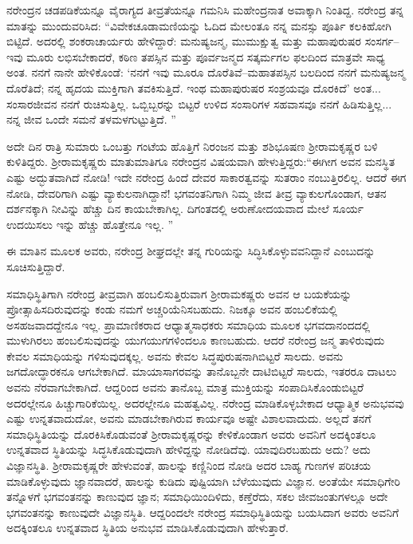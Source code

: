 ನರೇಂದ್ರನ ಚಡಪಡಿಕೆಯನ್ನೂ ವೈರಾಗ್ಯದ ತೀವ್ರತೆಯನ್ನೂ ಗಮನಿಸಿ ಮಹೇಂದ್ರನಾತ ಅವಾಕ್ಕಾಗಿ ನಿಂತಿದ್ದ. ನರೇಂದ್ರ ತನ್ನ ಮಾತನ್ನು ಮುಂದುವರಿಸಿದ: “ವಿವೇಕಚೂಡಾಮಣಿಯನ್ನು ಓದಿದ ಮೇಲಂತೂ ನನ್ನ ಮನಸ್ಸು ಪೂರ್ತಿ ಕಲಕಿಹೋಗಿ ಬಿಟ್ಟಿದೆ. ಅದರಲ್ಲಿ ಶಂಕರಾಚಾರ್ಯರು ಹೇಳಿದ್ದಾರೆ: ಮನುಷ್ಯಜನ್ಮ, ಮುಮುಕ್ಷುತ್ವ ಮತ್ತು ಮಹಾಪುರುಷರ ಸಂಸರ್ಗ–ಇವು ಮೂರು ಲಭಿಸಬೇಕಾದರೆ, ಕಠಿಣ ತಪಸ್ಸಿನ ಮತ್ತು ಪೂರ್ವಜನ್ಮದ ಸತ್ಕರ್ಮಗಲ ಫಲದಿಂದ ಮಾತ್ರವೇ ಸಾಧ್ಯ ಅಂತ. ನನಗೆ ನಾನೇ ಹೇಳಿಕೊಂಡೆ: ‘ನನಗೆ ಇವು ಮೂರೂ ದೊರೆತಿವೆ–ಮಹಾತಪಸ್ಸಿನ ಬಲದಿಂದ ನನಗೆ ಮನುಷ್ಯಜನ್ಮ ದೊರೆತಿದೆ; ನನ್ನ ಹೃದಯ ಮುಕ್ತಿಗಾಗಿ ತವಕಿಸುತ್ತಿದೆ. ಇಂಥ ಮಹಾಪುರುಷರ ಸಂಶ್ರಯವೂ ದೊರಕಿದೆ’ ಅಂತ... ಸಂಸಾರಜೀವನ ನನಗೆ ರುಚಿಸುತ್ತಿಲ್ಲ. ಒಬ್ಬಿಬ್ಬರನ್ನು ಬಿಟ್ಟರೆ ಉಳಿದ ಸಂಸಾರಿಗಳ ಸಹವಾಸವೂ ನನಗೆ ಹಿಡಿಸುತ್ತಿಲ್ಲ... ನನ್ನ ಜೀವ ಒಂದೇ ಸಮನೆ ತಳಮಳಗುಟ್ಟುತ್ತಿದೆ. ”

ಅದೇ ದಿನ ರಾತ್ರಿ ಸುಮಾರು ಒಂಬತ್ತು ಗಂಟೆಯ ಹೊತ್ತಿಗೆ ನಿರಂಜನ ಮತ್ತು ಶಶಿಭೂಷಣ ಶ್ರೀರಾಮಕೃಷ್ಣರ ಬಳಿ ಕುಳಿತಿದ್ದರು. ಶ್ರೀರಾಮಕೃಷ್ಣರು ಮಾತುಮಾತಿಗೂ ನರೇಂದ್ರನ ವಿಷಯವಾಗಿ ಹೇಳುತ್ತಿದ್ದರು:“ಈಗೀಗ ಅವನ ಮನಸ್ಥಿತ ಎಷ್ಟು ಅದ್ಭುತವಾಗಿದೆ ನೋಡಿ! ಇದೇ ನರೇಂದ್ರ ಹಿಂದೆ ದೇವರ ಸಾಕಾರತ್ವವನ್ನು ಸುತರಾಂ ನಂಬುತ್ತಿರಲಿಲ್ಲ. ಆದರೆ ಈಗ ನೋಡಿ, ದೇವರಿಗಾಗಿ ಎಷ್ಟು ವ್ಯಾಕುಲನಾಗಿದ್ದಾನೆ! ಭಗವಂತನಿಗಾಗಿ ನಿಮ್ಮ ಜೀವ ತೀವ್ರ ವ್ಯಾಕುಲಗೊಂಡಾಗ, ಆತನ ದರ್ಶನಕ್ಕಾಗಿ ನೀವಿನ್ನು ಹೆಚ್ಚು ದಿನ ಕಾಯಬೇಕಾಗಿಲ್ಲ. ದಿಗಂತದಲ್ಲಿ ಅರುಣೋದಯವಾದ ಮೇಲೆ ಸೂರ್ಯ ಉದಯಿಸಲು ಇನ್ನು ಹೆಚ್ಚು ಹೊತ್ತೇನೂ ಇಲ್ಲ. ”

ಈ ಮಾತಿನ ಮೂಲಕ ಅವರು, ನರೇಂದ್ರ ಶೀಘ್ರದಲ್ಲೇ ತನ್ನ ಗುರಿಯನ್ನು ಸಿದ್ಧಿಸಿಕೊಳ್ಳುವವನಿದ್ದಾನೆ ಎಂಬುದನ್ನು ಸೂಚಿಸುತ್ತಿದ್ದಾರೆ. 

ಸಮಾಧಿಸ್ಥಿತಿಗಾಗಿ ನರೇಂದ್ರ ತೀವ್ರವಾಗಿ ಹಂಬಲಿಸುತ್ತಿರುವಾಗ ಶ್ರೀರಾಮಕಷ್ಣರು ಅವನ ಆ ಬಯಕೆಯನ್ನು ಪ್ರೋತ್ಸಾಹಿಸದಿರುವುದನ್ನು ಕಂಡು ನಮಗೆ ಅಚ್ಚರಿಯೆನಿಸಬಹುದು. ನಿಜಕ್ಕೂ ಅವನ ಹಂಬಲಿಕೆಯಲ್ಲಿ ಅಸಹಜವಾದದ್ದೇನೂ ಇಲ್ಲ. ಪ್ರಾಮಾಣಿಕರಾದ ಆಧ್ಯಾತ್ಮಸಾಧಕರು ಸಮಾಧಿಯ ಮೂಲಕ ಭಗವದಾನಂದದಲ್ಲಿ ಮುಳುಗಿರಲು ಹಂಬಲಿಸುವುದನ್ನು ಯುಗಯುಗಗಳಿಂದಲೂ ಕಾಣಬಹುದು. ಆದರೆ ನರೇಂದ್ರ ಜನ್ಮ ತಾಳಿರುವುದು ಕೇವಲ ಸಮಾಧಿಯನ್ನು ಗಳಿಸುವುದಕ್ಕಲ್ಲ. ಅವನು ಕೇವಲ ಸಿದ್ಧಪುರುಷನಾಗಿಬಿಟ್ಟರೆ ಸಾಲದು. ಅವನು ಜಗದೋದ್ಧಾರಕನೂ ಆಗಬೇಕಾಗಿದೆ. ಮಾಯಾಸಾಗರವನ್ನು ತಾನೊಬ್ಬನೇ ದಾಟಿಬಿಟ್ಟರೆ ಸಾಲದು, ಇತರರೂ ದಾಟಲು ಅವನು ನೆರವಾಗಬೇಕಾಗಿದೆ. ಆದ್ದರಿಂದ ಅವನು ತಾನೊಬ್ಬ ಮಾತ್ರ ಮುಕ್ತಿಯನ್ನು ಸಂಪಾದಿಸಿಕೊಂಡುಬಿಟ್ಟರೆ ಅದರಲ್ಲೇನೂ ಹಿಚ್ಚುಗಾರಿಕೆಯಿಲ್ಲ. ಅದರಲ್ಲೇನೂ ಮಹತ್ವವಿಲ್ಲ. ನರೇಂದ್ರ ಮಾಡಿಕೊಳ್ಳಬೇಕಾದ ಆಧ್ಯಾತ್ಮಿಕ ಅನುಭವವು ಎಷ್ಟು ಉನ್ನತವಾದುದೋ, ಅವನು ಮಾಡಬೇಕಾಗಿರುವ ಕಾರ್ಯವೂ ಅಷ್ಟೇ ವಿಶಾಲವಾದುದು. ಅಲ್ಲದೆ ತನಗೆ ಸಮಾಧಿಸ್ಥಿತಿಯನ್ನು ದೊರಕಿಸಿಕೊಡುವಂತೆ ಶ್ರೀರಾಮಕೃಷ್ಣರನ್ನು ಕೇಳಿಕೊಂಡಾಗ ಅವರು ಅವನಿಗೆ ಅದಕ್ಕಿಂತಲೂ ಉನ್ನತವಾದ ಸ್ಥಿತಿಯನ್ನು ಸಿದ್ಧಸಿಕೊಡುವುದಾಗಿ ಹೇಳಿದ್ದನ್ನು ನೋಡಿದೆವು. ಯಾವುದಿರಬಹುದು ಅದು? ಅದು ವಿಜ್ಞಾನಸ್ಥಿತಿ. ಶ್ರೀರಾಮಕೃಷ್ಣರೇ ಹೇಳುವಂತೆ, ಹಾಲನ್ನು ಕಣ್ಣಿನಿಂದ ನೋಡಿ ಅದರ ಬಾಹ್ಯ ಗುಣಗಳ ಪರಿಚಯ ಮಾಡಿಕೊಳ್ಳುವುದು ಜ್ಞಾನವಾದರೆ, ಹಾಲನ್ನು ಕುಡಿದು ಪುಷ್ಟಿಯಾಗಿ ಬೆಳೆಯುವುದು ವಿಜ್ಞಾನ. ಅಂತೆಯೇ ಸಮಾಧಿಗೇರಿ ತನ್ನೊಳಗೆ ಭಗವಂತನನ್ನು ಕಾಣುವುದ ಜ್ಞಾನ; ಸಮಾಧಿಯಿಂದಿಳಿದು, ಕಣ್ತೆರೆದು, ಸಕಲ ಜೀವಜಂತುಗಳಲ್ಲೂ ಅದೇ ಭಗವಂತನನ್ನು ಕಾಣುವುದೇ ವಿಜ್ಞಾನಸ್ಥಿತಿ. ಆದ್ದರಿಂದಲೇ ನರೇಂದ್ರ ಸಮಾಧಿಸ್ಥಿತಿಯನ್ನು ಬಯಸಿದಾಗ ಅವರು ಅವನಿಗೆ ಅದಕ್ಕಿಂತಲೂ ಉನ್ನತವಾದ ಸ್ಥಿತಿಯ ಅನುಭವ ಮಾಡಿಸಿಕೊಡುವುದಾಗಿ ಹೇಳುತ್ತಾರೆ.

